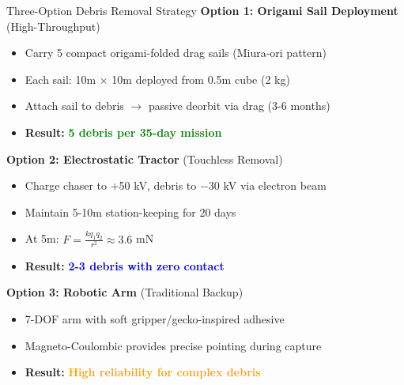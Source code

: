 \documentclass[aspectratio=169]{beamer}
\begin{document}
\begin{frame}{Three-Option Debris Removal Strategy}
\textbf{Option 1: Origami Sail Deployment} \textcolor{green!70!black}{(High-Throughput)}
\begin{itemize}
    \item Carry 5 compact origami-folded drag sails (Miura-ori pattern)
    \item Each sail: 10m × 10m deployed from 0.5m cube (2 kg)
    \item Attach sail to debris $\rightarrow$ passive deorbit via drag (3-6 months)
    \item \textbf{Result:} \textcolor{green}{\textbf{5 debris per 35-day mission}}
\end{itemize}

\vspace{0.2cm}
\textbf{Option 2: Electrostatic Tractor} \textcolor{blue!70!black}{(Touchless Removal)}
\begin{itemize}
    \item Charge chaser to +50 kV, debris to $-30$ kV via electron beam
    \item Maintain 5-10m station-keeping for 20 days
    \item At 5m: $F = \frac{k q_1 q_2}{r^2} \approx 3.6$ mN
    \item \textbf{Result:} \textcolor{blue}{\textbf{2-3 debris with zero contact}}
\end{itemize}

\vspace{0.2cm}
\textbf{Option 3: Robotic Arm} \textcolor{orange!80!black}{(Traditional Backup)}
\begin{itemize}
    \item 7-DOF arm with soft gripper/gecko-inspired adhesive
    \item Magneto-Coulombic provides precise pointing during capture
    \item \textbf{Result:} \textcolor{orange}{\textbf{High reliability for complex debris}}
\end{itemize}
\end{frame}
\end{document}
